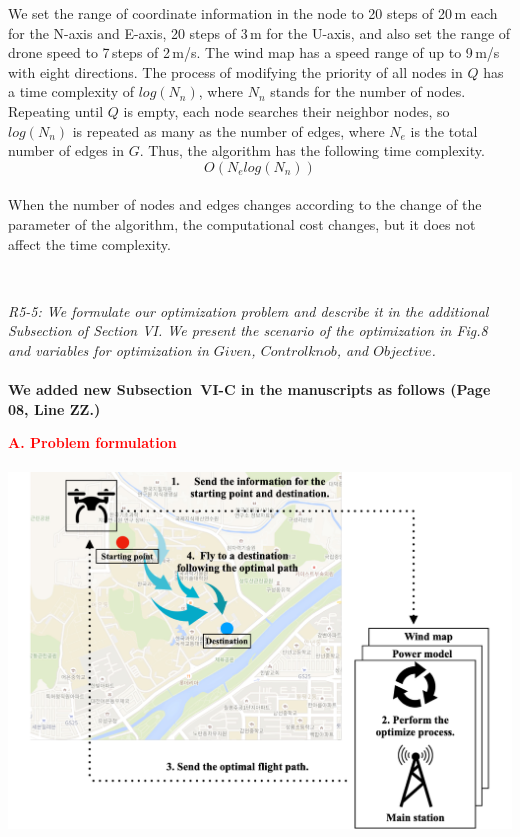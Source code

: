 \documentclass[onecolumn]{IEEEconf}
\begin{document}
\begin{description}
\begin{mdframed}[ linewidth=.75pt, userdefinedwidth=0.9\textwidth]
{    We set the range of coordinate information in the node to 20 steps of 20\,m each for the N-axis and E-axis, 20 steps of 3\,m for the U-axis, and also set the range of drone speed to 7\,steps of 2\,m/s. 
    The wind map has a speed range of up to 9\,m/s with eight directions.
    The process of modifying the priority of all nodes in $Q$ has a time complexity of $log(N_n)$, where $N_n$ stands for the number of nodes.
    Repeating until $Q$ is empty, each node searches their neighbor nodes, so $log(N_n)$ is repeated as many as the number of edges, where $N_e$ is the total number of edges in $G$. 
    Thus, the algorithm has the following time complexity.~\\
    \begin{equation*}
    O(N_elog(N_n)) \tag{6.3} \label{eq:complexity}
    \end{equation*}~\\
    When the number of nodes and edges changes according to the change of the parameter of the algorithm, the computational cost changes, but it does not affect the time complexity.
    }
    \end{mdframed} 
    ~\\
	\item \textit
	{
	R5-5: We formulate our optimization problem and describe it in the additional Subsection of Section VI. We present the scenario of the optimization in Fig.8 and variables for optimization in $Given$, $Control knob$, and $Objective$.
	}
	~\\
	~\\
	\textbf{We added new Subsection~VI-C in the manuscripts as follows (Page 08, Line ZZ.)}\\
    \begin{mdframed}[ linewidth=.75pt, userdefinedwidth=0.9\textwidth]
    \textbf{\justify\textcolor{red}{A. Problem formulation}}~\\
    ~\\
    \includegraphics[scale=0.34]{fig8/problem_formulation.pdf}~\\

\end{mdframed}
\end{description}
\end{document}
